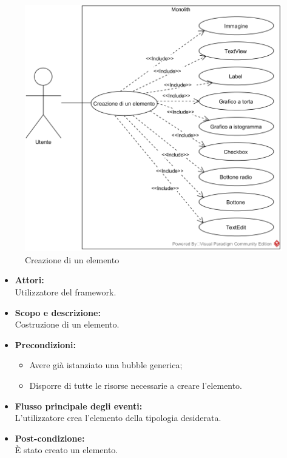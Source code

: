 \pagebreak


\begin{figure}[H]
	\centering
	\includegraphics[width=15cm]{../../documenti/AnalisiDeiRequisiti/Diagrammi_img/creazione_elem.png}
	\caption{\UCFCaption{} Creazione di un elemento}
\end{figure}

\begin{itemize}
	\item \textbf{Attori:}
	\\Utilizzatore del framework.
	\item \textbf{Scopo e descrizione:} 
	\\Costruzione di un elemento.
	\item \textbf{Precondizioni:}
	\begin{itemize}
		\item Avere già istanziato una bubble generica;
		\item Disporre di tutte le risorse necessarie a creare l'elemento.
	\end{itemize}
	\item \textbf{Flusso principale degli eventi:}
	\\L'utilizzatore crea l'elemento della tipologia desiderata.
	\item \textbf{Post-condizione:}
	\\È stato creato un elemento.
\end{itemize}

